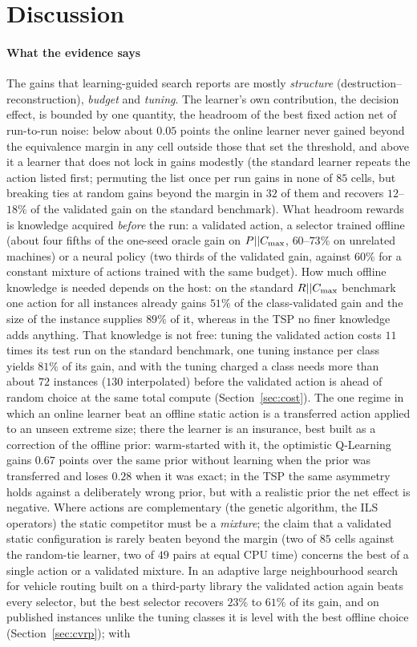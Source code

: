 \section{Discussion}
\label{sec:discussion}
\paragraph{What the evidence says} The gains that learning-guided search reports are mostly \emph{structure} (destruction--reconstruction), \emph{budget} and \emph{tuning}. The learner's own contribution, the decision effect, is bounded by one quantity, the headroom of the best fixed action net of run-to-run noise: below about $0.05$ points the online learner never gained beyond the equivalence margin in any cell outside those that set the threshold, and above it a learner that does not lock in gains modestly (the standard learner repeats the action listed first; permuting the list once per run gains in none of $85$ cells, but breaking ties at random gains beyond the margin in $32$ of them and recovers $12$--$18\%$ of the validated gain on the standard benchmark). What headroom rewards is knowledge acquired \emph{before} the run: a validated action, a selector trained offline (about four fifths of the one-seed oracle gain on $P||C_{\max}$, $60$--$73\%$ on unrelated machines) or a neural policy (two thirds of the validated gain, against $60\%$ for a constant mixture of actions trained with the same budget). How much offline knowledge is needed depends on the host: on the standard $R||C_{\max}$ benchmark one action for all instances already gains $51\%$ of the class-validated gain and the size of the instance supplies $89\%$ of it, whereas in the TSP no finer knowledge adds anything. That knowledge is not free: tuning the validated action costs $11$ times its test run on the standard benchmark, one tuning instance per class yields $81\%$ of its gain, and with the tuning charged a class needs more than about $72$ instances ($130$ interpolated) before the validated action is ahead of random choice at the same total compute (Section~\ref{sec:cost}). The one regime in which an online learner beat an offline static action is a transferred action applied to an unseen extreme size; there the learner is an insurance, best built as a correction of the offline prior: warm-started with it, the optimistic Q-Learning gains $0.67$ points over the same prior without learning when the prior was transferred and loses $0.28$ when it was exact; in the TSP the same asymmetry holds against a deliberately wrong prior, but with a realistic prior the net effect is negative. Where actions are complementary (the genetic algorithm, the ILS operators) the static competitor must be a \emph{mixture}; the claim that a validated static configuration is rarely beaten beyond the margin (two of $85$ cells against the random-tie learner, two of $49$ pairs at equal CPU time) concerns the best of a single action or a validated mixture. In an adaptive large neighbourhood search for vehicle routing built on a third-party library the validated action again beats every selector, but the best selector recovers $23\%$ to $61\%$ of its gain, and on published instances unlike the tuning classes it is level with the best offline choice (Section~\ref{sec:cvrp}); with 